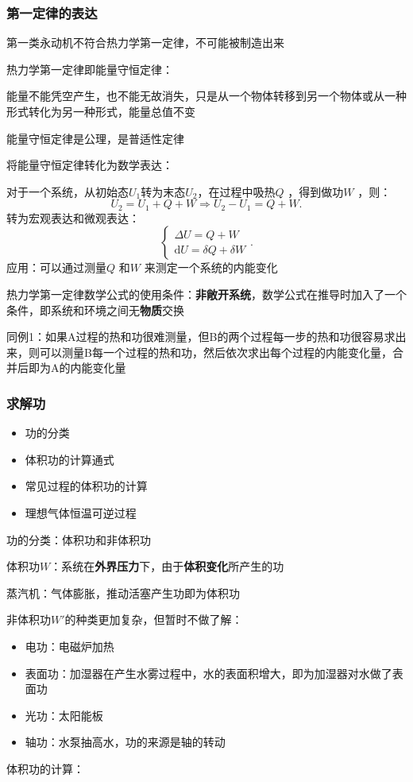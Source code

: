 \subsubsection*{第一定律的表达}%
\label{subsub:第一定律的表达}
\begin{notation}
    第一类永动机不符合热力学第一定律，不可能被制造出来
\end{notation}
热力学第一定律即能量守恒定律：
\begin{defi}
    能量不能凭空产生，也不能无故消失，只是从一个物体转移到另一个物体或从一种形式转化为另一种形式，能量总值不变
\end{defi}
\begin{notation}
    能量守恒定律是公理，是普适性定律
\end{notation}
将能量守恒定律转化为数学表达：

对于一个系统，从初始态$U_1$转为末态$U_2$，在过程中吸热$Q$ ，得到做功$W$ ，则：\[
    U_2=U_1+Q+W\Rightarrow U_2-U_1=Q+W
.\]
转为宏观表达和微观表达：\[
    \begin{cases}
        \Delta U = Q+W\\
        \mathrm{d}U = \delta Q+\delta W
    \end{cases}
.\]
应用：可以通过测量$Q$ 和$W$ 来测定一个系统的内能变化
\begin{notation}
    热力学第一定律数学公式的使用条件：\textbf{非敞开系统}，数学公式在推导时加入了一个条件，即系统和环境之间无\textbf{物质}交换
\end{notation}
\begin{eg}
    同例1：如果A过程的热和功很难测量，但B的两个过程每一步的热和功很容易求出来，则可以测量B每一个过程的热和功，然后依次求出每个过程的内能变化量，合并后即为A的内能变化量
\end{eg}
\subsubsection*{求解功}%
\label{subsub:求解功}
\begin{itemize}
    \item 功的分类
    \item 体积功的计算通式
    \item 常见过程的体积功的计算
    \item 理想气体恒温可逆过程
\end{itemize}
功的分类：体积功和非体积功
\begin{defi}
    体积功$W$：系统在\textbf{外界压力}下，由于\textbf{体积变化}所产生的功
\end{defi}
\begin{eg}
    蒸汽机：气体膨胀，推动活塞产生功即为体积功
\end{eg}
非体积功$W'$的种类更加复杂，但暂时不做了解：
\begin{itemize}
    \item 电功：电磁炉加热
    \item 表面功：加湿器在产生水雾过程中，水的表面积增大，即为加湿器对水做了表面功
    \item 光功：太阳能板
    \item 轴功：水泵抽高水，功的来源是轴的转动
\end{itemize}
体积功的计算：


